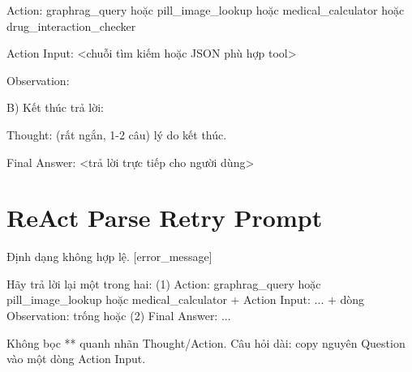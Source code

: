 \documentclass[../main.tex]{subfiles}
\begin{document}
\noindent Action: graphrag\_query hoặc pill\_image\_lookup hoặc medical\_calculator hoặc drug\_interaction\_checker

\noindent Action Input: \textless chuỗi tìm kiếm hoặc JSON phù hợp tool\textgreater

\noindent Observation:

\vspace{0.25cm}
\noindent
B) Kết thúc trả lời:

\noindent Thought: (rất ngắn, 1-2 câu) lý do kết thúc.

\noindent Final Answer: \textless trả lời trực tiếp cho người dùng\textgreater

\endgroup

\section*{ReAct Parse Retry Prompt}
\begingroup
\ttfamily
\noindent
Định dạng không hợp lệ. [error\_message]

\noindent
Hãy trả lời lại một trong hai: (1) Action: graphrag\_query hoặc pill\_image\_lookup hoặc medical\_calculator + Action Input: ... + dòng Observation: trống hoặc (2) Final Answer: ...

\noindent
Không bọc ** quanh nhãn Thought/Action. Câu hỏi dài: copy nguyên Question vào một dòng Action Input.
\endgroup
\end{document}
